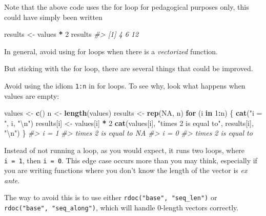 \documentclass[]{book}
\newenvironment{Shaded}{\begin{snugshade}}{\end{snugshade}}
\newcommand{\CharTok}[1]{\textcolor[rgb]{0.31,0.60,0.02}{#1}}
\newcommand{\CommentTok}[1]{\textcolor[rgb]{0.56,0.35,0.01}{\textit{#1}}}
\newcommand{\ControlFlowTok}[1]{\textcolor[rgb]{0.13,0.29,0.53}{\textbf{#1}}}
\newcommand{\DecValTok}[1]{\textcolor[rgb]{0.00,0.00,0.81}{#1}}
\newcommand{\KeywordTok}[1]{\textcolor[rgb]{0.13,0.29,0.53}{\textbf{#1}}}
\newcommand{\NormalTok}[1]{#1}
\newcommand{\OperatorTok}[1]{\textcolor[rgb]{0.81,0.36,0.00}{\textbf{#1}}}
\newcommand{\OtherTok}[1]{\textcolor[rgb]{0.56,0.35,0.01}{#1}}
\newcommand{\StringTok}[1]{\textcolor[rgb]{0.31,0.60,0.02}{#1}}
\theoremstyle{definition}
\theoremstyle{definition}
\theoremstyle{definition}
\theoremstyle{remark}
\begin{document}
Note that the above code uses the for loop for pedagogical purposes
only, this could have simply been written

\begin{Shaded}
\begin{Highlighting}[]
\NormalTok{results <-}\StringTok{ }\NormalTok{values }\OperatorTok{*}\StringTok{ }\DecValTok{2}
\NormalTok{results}
\CommentTok{#> [1]  4  6 12}
\end{Highlighting}
\end{Shaded}

In general, avoid using for loops when there is a \emph{vectorized}
function.

But sticking with the for loop, there are several things that could be
improved.

Avoid using the idiom \texttt{1:n} in for loops. To see why, look what
happens when values are empty:

\begin{Shaded}
\begin{Highlighting}[]
\NormalTok{values <-}\StringTok{ }\KeywordTok{c}\NormalTok{()}
\NormalTok{n <-}\StringTok{ }\KeywordTok{length}\NormalTok{(values)}
\NormalTok{results <-}\StringTok{ }\KeywordTok{rep}\NormalTok{(}\OtherTok{NA}\NormalTok{, n)}
\ControlFlowTok{for}\NormalTok{ (i }\ControlFlowTok{in} \DecValTok{1}\OperatorTok{:}\NormalTok{n) \{}
  \KeywordTok{cat}\NormalTok{(}\StringTok{"i = "}\NormalTok{, i, }\StringTok{"}\CharTok{\textbackslash{}n}\StringTok{"}\NormalTok{)}
\NormalTok{  results[i] <-}\StringTok{ }\NormalTok{values[i] }\OperatorTok{*}\StringTok{ }\DecValTok{2}
  \KeywordTok{cat}\NormalTok{(values[i], }\StringTok{"times 2 is equal to"}\NormalTok{, results[i], }\StringTok{"}\CharTok{\textbackslash{}n}\StringTok{"}\NormalTok{)}
\NormalTok{\}}
\CommentTok{#> i =  1 }
\CommentTok{#>  times 2 is equal to NA }
\CommentTok{#> i =  0 }
\CommentTok{#>  times 2 is equal to}
\end{Highlighting}
\end{Shaded}

Instead of not running a loop, as you would expect, it runs two loops,
where \texttt{i\ =\ 1}, then \texttt{i\ =\ 0}. This edge case occurs
more than you may think, especially if you are writing functions where
you don't know the length of the vector is \emph{ex ante}.

The way to avoid this is to use either
\texttt{rdoc("base",\ "seq\_len")} or
\texttt{rdoc("base",\ "seq\_along")}, which will handle 0-length vectors
correctly.
\end{document}
